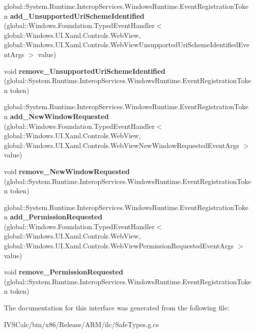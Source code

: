 \begin{DoxyCompactItemize}
\mbox{\label{interface_windows_1_1_u_i_1_1_xaml_1_1_controls_1_1_i_web_view4_a6e70ca803e5cf51c343058bd94efe3cb}} 
global\+::\+System.\+Runtime.\+Interop\+Services.\+Windows\+Runtime.\+Event\+Registration\+Token {\bfseries add\+\_\+\+Unsupported\+Uri\+Scheme\+Identified} (global\+::\+Windows.\+Foundation.\+Typed\+Event\+Handler$<$ global\+::\+Windows.\+U\+I.\+Xaml.\+Controls.\+Web\+View, global\+::\+Windows.\+U\+I.\+Xaml.\+Controls.\+Web\+View\+Unsupported\+Uri\+Scheme\+Identified\+Event\+Args $>$ value)
\item 
\mbox{\label{interface_windows_1_1_u_i_1_1_xaml_1_1_controls_1_1_i_web_view4_a434db913b569c214fdd8ee1886fb3295}} 
void {\bfseries remove\+\_\+\+Unsupported\+Uri\+Scheme\+Identified} (global\+::\+System.\+Runtime.\+Interop\+Services.\+Windows\+Runtime.\+Event\+Registration\+Token token)
\item 
\mbox{\label{interface_windows_1_1_u_i_1_1_xaml_1_1_controls_1_1_i_web_view4_a31260436a1ad23171cfab6d9aa36d4d0}} 
global\+::\+System.\+Runtime.\+Interop\+Services.\+Windows\+Runtime.\+Event\+Registration\+Token {\bfseries add\+\_\+\+New\+Window\+Requested} (global\+::\+Windows.\+Foundation.\+Typed\+Event\+Handler$<$ global\+::\+Windows.\+U\+I.\+Xaml.\+Controls.\+Web\+View, global\+::\+Windows.\+U\+I.\+Xaml.\+Controls.\+Web\+View\+New\+Window\+Requested\+Event\+Args $>$ value)
\item 
\mbox{\label{interface_windows_1_1_u_i_1_1_xaml_1_1_controls_1_1_i_web_view4_a06f4976e0ae89feefa9ca60a799e7301}} 
void {\bfseries remove\+\_\+\+New\+Window\+Requested} (global\+::\+System.\+Runtime.\+Interop\+Services.\+Windows\+Runtime.\+Event\+Registration\+Token token)
\item 
\mbox{\label{interface_windows_1_1_u_i_1_1_xaml_1_1_controls_1_1_i_web_view4_adc0957ca3dc33612444167bf57005531}} 
global\+::\+System.\+Runtime.\+Interop\+Services.\+Windows\+Runtime.\+Event\+Registration\+Token {\bfseries add\+\_\+\+Permission\+Requested} (global\+::\+Windows.\+Foundation.\+Typed\+Event\+Handler$<$ global\+::\+Windows.\+U\+I.\+Xaml.\+Controls.\+Web\+View, global\+::\+Windows.\+U\+I.\+Xaml.\+Controls.\+Web\+View\+Permission\+Requested\+Event\+Args $>$ value)
\item 
\mbox{\label{interface_windows_1_1_u_i_1_1_xaml_1_1_controls_1_1_i_web_view4_a991ecf7ea74a7ba6b4e0df9150bd903e}} 
void {\bfseries remove\+\_\+\+Permission\+Requested} (global\+::\+System.\+Runtime.\+Interop\+Services.\+Windows\+Runtime.\+Event\+Registration\+Token token)
\end{DoxyCompactItemize}


The documentation for this interface was generated from the following file\+:\begin{DoxyCompactItemize}
\item 
I\+V\+S\+Calc/bin/x86/\+Release/\+A\+R\+M/ilc/Safe\+Types.\+g.\+cs\end{DoxyCompactItemize}
